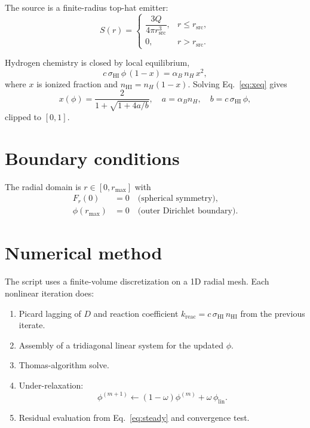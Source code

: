 \documentclass[11pt]{article}
\begin{document}
The source is a finite-radius top-hat emitter:
\begin{equation}
S(r)=
\begin{cases}
\dfrac{3Q}{4\pi r_{\mathrm{src}}^3}, & r \le r_{\mathrm{src}},\\[4pt]
0, & r>r_{\mathrm{src}}.
\end{cases}
\end{equation}

Hydrogen chemistry is closed by local equilibrium,
\begin{equation}
c\,\sigma_{\mathrm{HI}}\,\phi\,(1-x)=\alpha_B\,n_H\,x^2,
\label{eq:xeq}
\end{equation}
where $x$ is ionized fraction and $n_{\mathrm{HI}}=n_H(1-x)$. Solving Eq.~\eqref{eq:xeq} gives
\begin{equation}
x(\phi)=\frac{2}{1+\sqrt{1+4a/b}},
\quad a=\alpha_B n_H,\quad b=c\,\sigma_{\mathrm{HI}}\,\phi,
\end{equation}
clipped to $[0,1]$.

\section{Boundary conditions}
The radial domain is $r\in[0,r_{\max}]$ with
\begin{align}
F_r(0) &= 0 \quad \text{(spherical symmetry)},\\
\phi(r_{\max}) &= 0 \quad \text{(outer Dirichlet boundary)}.
\end{align}

\section{Numerical method}
The script uses a finite-volume discretization on a 1D radial mesh.
Each nonlinear iteration does:
\begin{enumerate}
\item Picard lagging of $D$ and reaction coefficient $k_{\mathrm{reac}}=c\,\sigma_{\mathrm{HI}}\,n_{\mathrm{HI}}$ from the previous iterate.
\item Assembly of a tridiagonal linear system for the updated $\phi$.
\item Thomas-algorithm solve.
\item Under-relaxation:
\[
\phi^{(m+1)} \leftarrow (1-\omega)\phi^{(m)} + \omega\,\phi_{\mathrm{lin}}.
\]
\item Residual evaluation from Eq.~\eqref{eq:steady} and convergence test.
\end{enumerate}
\end{document}
